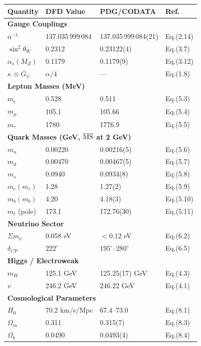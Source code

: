 \documentclass[11pt,a4paper]{article}
\theoremstyle{remark}
\begin{document}
\begin{longtable}{p{4.5cm}p{4cm}p{2.5cm}p{2.5cm}}
\toprule
\textbf{Quantity} & \textbf{DFD Value} & \textbf{PDG/CODATA} & \textbf{Ref.} \\
\midrule
\endhead
\multicolumn{4}{l}{\textbf{Gauge Couplings}} \\
\midrule
$\alpha^{-1}$ & 137.035\,999\,084 & 137.035\,999\,084(21) & Eq.(2.14) \\
$\sin^2\theta_W$ & 0.2312 & 0.23122(4) & Eq.(3.7) \\
$\alpha_s(M_Z)$ & 0.1179 & 0.1179(9) & Eq.(3.12) \\
$\kappa \equiv G_\psi$ & $\alpha/4$ & --- & Eq.(1.8) \\
\midrule
\multicolumn{4}{l}{\textbf{Lepton Masses (MeV)}} \\
\midrule
$m_e$ & 0.528 & 0.511 & Eq.(5.3) \\
$m_\mu$ & 105.1 & 105.66 & Eq.(5.4) \\
$m_\tau$ & 1780 & 1776.9 & Eq.(5.5) \\
\midrule
\multicolumn{4}{l}{\textbf{Quark Masses (GeV, $\overline{\rm MS}$ at 2 GeV)}} \\
\midrule
$m_u$ & 0.00220 & 0.00216(5) & Eq.(5.6) \\
$m_d$ & 0.00470 & 0.00467(5) & Eq.(5.7) \\
$m_s$ & 0.0940 & 0.0934(8) & Eq.(5.8) \\
$m_c(m_c)$ & 1.28 & 1.27(2) & Eq.(5.9) \\
$m_b(m_b)$ & 4.20 & 4.18(3) & Eq.(5.10) \\
$m_t$ (pole) & 173.1 & 172.76(30) & Eq.(5.11) \\
\midrule
\multicolumn{4}{l}{\textbf{Neutrino Sector}} \\
\midrule
$\Sigma m_\nu$ & 0.058 eV & $< 0.12$ eV & Eq.(6.2) \\
$\delta_{CP}$ & $222^\circ$ & $195^\circ$--$280^\circ$ & Eq.(6.5) \\
\midrule
\multicolumn{4}{l}{\textbf{Higgs / Electroweak}} \\
\midrule
$m_H$ & 125.1 GeV & 125.25(17) GeV & Eq.(4.3) \\
$v$ & 246.2 GeV & 246.22 GeV & Eq.(4.1) \\
\midrule
\multicolumn{4}{l}{\textbf{Cosmological Parameters}} \\
\midrule
$H_0$ & 70.2 km/s/Mpc & 67.4--73.0 & Eq.(8.1) \\
$\Omega_m$ & 0.311 & 0.315(7) & Eq.(8.3) \\
$\Omega_b$ & 0.0490 & 0.0493(4) & Eq.(8.4) \\

\end{longtable}
\end{document}
